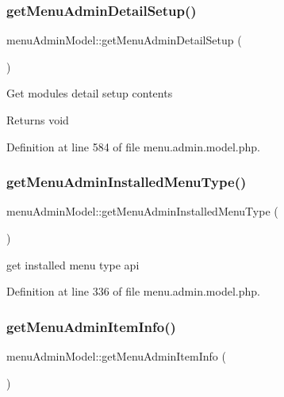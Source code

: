 \subsubsection{\texorpdfstring{get\+Menu\+Admin\+Detail\+Setup()}{getMenuAdminDetailSetup()}}
{\footnotesize\ttfamily menu\+Admin\+Model\+::get\+Menu\+Admin\+Detail\+Setup (\begin{DoxyParamCaption}{ }\end{DoxyParamCaption})}

Get module\textquotesingle{}s detail setup contents \begin{DoxyReturn}{Returns}
void 
\end{DoxyReturn}


Definition at line 584 of file menu.\+admin.\+model.\+php.

\hypertarget{classmenuAdminModel_a1fd1ae309603a0fc0b58589d2cc0d025}{}\label{classmenuAdminModel_a1fd1ae309603a0fc0b58589d2cc0d025} 
\subsubsection{\texorpdfstring{get\+Menu\+Admin\+Installed\+Menu\+Type()}{getMenuAdminInstalledMenuType()}}
{\footnotesize\ttfamily menu\+Admin\+Model\+::get\+Menu\+Admin\+Installed\+Menu\+Type (\begin{DoxyParamCaption}{ }\end{DoxyParamCaption})}

get installed menu type api 

Definition at line 336 of file menu.\+admin.\+model.\+php.

\hypertarget{classmenuAdminModel_a12a02d8f3441f1454fe22e5b8d927de5}{}\label{classmenuAdminModel_a12a02d8f3441f1454fe22e5b8d927de5} 
\subsubsection{\texorpdfstring{get\+Menu\+Admin\+Item\+Info()}{getMenuAdminItemInfo()}}
{\footnotesize\ttfamily menu\+Admin\+Model\+::get\+Menu\+Admin\+Item\+Info (\begin{DoxyParamCaption}{ }\end{DoxyParamCaption})}

